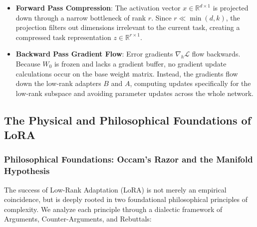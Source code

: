 \begin{itemize}
  \item \textbf{Forward Pass Compression}: The activation vector $x \in \mathbb{R}^{d \times 1}$ is projected down through a narrow bottleneck of rank $r$. Since $r \ll \min(d, k)$, the projection filters out dimensions irrelevant to the current task, creating a compressed task representation $z \in \mathbb{R}^{r \times 1}$.
  \item \textbf{Backward Pass Gradient Flow}: Error gradients $\nabla_h \mathcal{L}$ flow backwards. Because $W_0$ is frozen and lacks a gradient buffer, no gradient update calculations occur on the base weight matrix. Instead, the gradients flow down the low-rank adapters $B$ and $A$, computing updates specifically for the low-rank subspace and avoiding parameter updates across the whole network.
\end{itemize}

\subsection{The Physical and Philosophical Foundations of LoRA}

\subsubsection{Philosophical Foundations: Occam's Razor and the Manifold Hypothesis}
The success of Low-Rank Adaptation (LoRA) is not merely an empirical coincidence, but is deeply rooted in two foundational philosophical principles of complexity. We analyze each principle through a dialectic framework of Arguments, Counter-Arguments, and Rebuttals:

